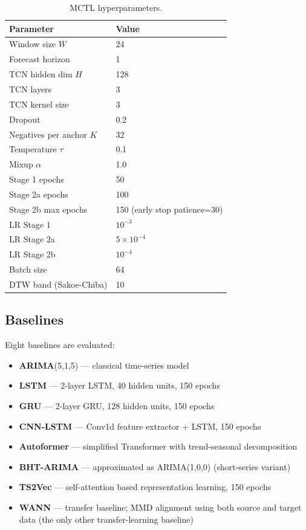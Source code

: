 \documentclass[12pt,a4paper]{article}
\begin{document}
\begin{table}[H]
\centering
\caption{MCTL hyperparameters.}
\label{tab:hyperparams}
\begin{tabular}{@{}ll@{}}
\toprule
\textbf{Parameter} & \textbf{Value} \\
\midrule
Window size $W$ & 24 \\
Forecast horizon & 1 \\
TCN hidden dim $H$ & 128 \\
TCN layers & 3 \\
TCN kernel size & 3 \\
Dropout & 0.2 \\
Negatives per anchor $K$ & 32 \\
Temperature $\tau$ & 0.1 \\
Mixup $\alpha$ & 1.0 \\
Stage 1 epochs & 50 \\
Stage 2a epochs & 100 \\
Stage 2b max epochs & 150 (early stop patience=30) \\
LR Stage 1 & $10^{-3}$ \\
LR Stage 2a & $5 \times 10^{-4}$ \\
LR Stage 2b & $10^{-4}$ \\
Batch size & 64 \\
DTW band (Sakoe-Chiba) & 10 \\
\bottomrule
\end{tabular}
\end{table}

\subsection{Baselines}

Eight baselines are evaluated:
\begin{itemize}
    \item \textbf{ARIMA}(5,1,5) — classical time-series model
    \item \textbf{LSTM} — 2-layer LSTM, 40 hidden units, 150 epochs
    \item \textbf{GRU} — 2-layer GRU, 128 hidden units, 150 epochs
    \item \textbf{CNN-LSTM} — Conv1d feature extractor + LSTM, 150 epochs
    \item \textbf{Autoformer} — simplified Transformer with trend-seasonal decomposition
    \item \textbf{BHT-ARIMA} — approximated as ARIMA(1,0,0) (short-series variant)
    \item \textbf{TS2Vec} — self-attention based representation learning, 150 epochs
    \item \textbf{WANN} — transfer baseline; MMD alignment using both source and
    target data (the only other transfer-learning baseline)
\end{itemize}
\end{document}
